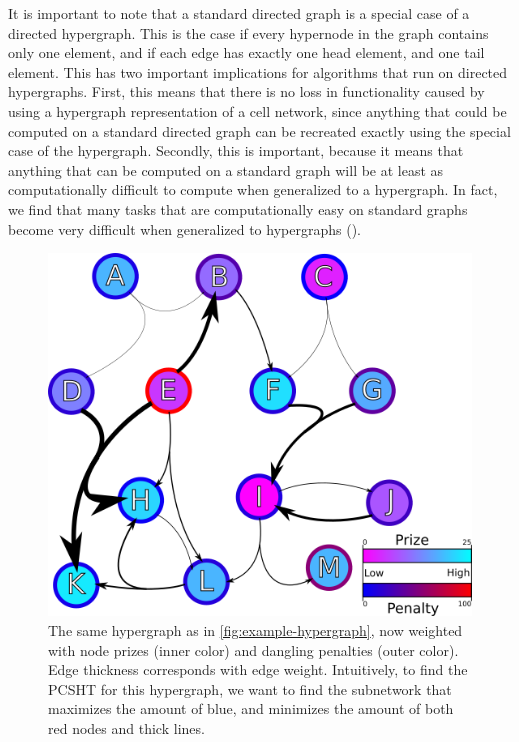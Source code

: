 \documentclass[12pt,twoside]{reedthesis}
\theoremstyle{definition}
\begin{document}
It is important to note that a standard directed graph is a special case of a directed hypergraph.  This is the case if every hypernode in the graph contains only one element, and if each edge has exactly one head element, and one tail element.  This has two important implications for algorithms that run on directed hypergraphs.  First, this means that there is no loss in functionality caused by using a hypergraph representation of a cell network, since anything that could be computed on a standard directed graph can be recreated exactly using the special case of the hypergraph. Secondly, this is important, because it means that anything that can be computed on a standard graph will be at least as computationally difficult to compute when generalized to a hypergraph.  In fact, we find that many tasks that are computationally easy on standard graphs become very difficult when generalized to hypergraphs (\cite{Ritz2014a}).\par

\begin{figure}[thbp]
  \begin{center}
    \includegraphics{example-hypergraph-weighted}
  \caption{The same hypergraph as in \ref{fig:example-hypergraph}, now weighted with node prizes (inner color) and dangling penalties (outer color). Edge thickness corresponds with edge weight. Intuitively, to find the PCSHT for this hypergraph, we want to find the subnetwork that maximizes the amount of blue, and minimizes the amount of both red nodes and thick lines.}
  \label{fig:example-hypergraph-weighted}
  \end{center}
\end{figure}
\end{document}
